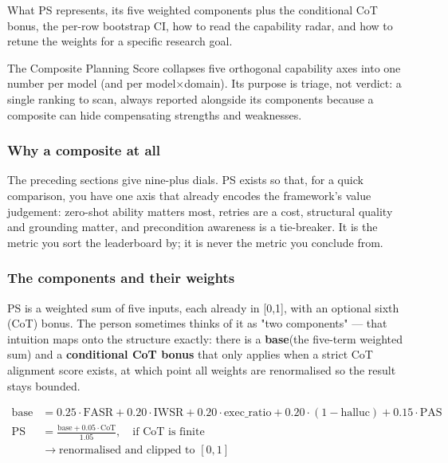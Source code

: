 What PS represents, its five weighted components plus the conditional CoT bonus, the per-row bootstrap CI, how to read the capability radar, and how to retune the weights for a specific research goal.

The Composite Planning Score collapses five orthogonal capability axes into one number per model (and per model\(\times\)domain). Its purpose is triage, not verdict: a single ranking to scan, always reported alongside its components because a composite can hide compensating strengths and weaknesses.

\subsubsection{Why a composite at all}

The preceding sections give nine-plus dials. PS exists so that, for a quick comparison, you have one axis that already encodes the framework's value judgement: zero-shot ability matters most, retries are a cost, structural quality and grounding matter, and precondition awareness is a tie-breaker. It is the metric you sort the leaderboard by; it is never the metric you conclude from.

\subsubsection{The components and their weights}

PS is a weighted sum of five inputs, each already in [0,1], with an optional sixth (CoT) bonus. The person sometimes thinks of it as "two components" --- that intuition maps onto the structure exactly: there is a \textbf{base}(the five-term weighted sum) and a \textbf{conditional CoT bonus} that only applies when a strict CoT alignment score exists, at which point all weights are renormalised so the result stays bounded.

\begin{bmformulabox}
\begin{align*}
\text{base} &=
0.25 \cdot \text{FASR}
+ 0.20 \cdot \text{IWSR}
+ 0.20 \cdot \text{exec\_ratio}
+ 0.20 \cdot (1 - \text{halluc})
+ 0.15 \cdot \text{PAS}
\\[4pt]
\text{PS} &=
\frac{\text{base} + 0.05 \cdot \text{CoT}}{1.05},
\quad \text{if CoT is finite}
\\[4pt]
&\rightarrow \text{renormalised and clipped to } [0,1]
\end{align*}
\end{bmformulabox}

